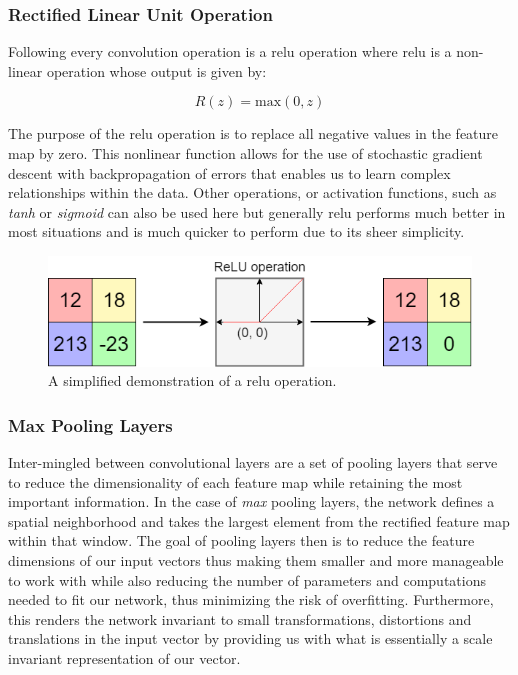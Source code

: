 \subsubsection{Rectified Linear Unit Operation}
\label{subsubsec:Background-Information:Forecasting-Models:Convolutional-Neural-Networks:ReLU}
Following every convolution operation is a \gls{relu} operation where \gls{relu} is a non-linear operation whose output is given by:

\begin{equation}
    R(z) = \text{max}(0, z)
\label{eq:ReLU}
\end{equation}

\noindent \newline The purpose of the \gls{relu} operation is to replace all negative values in the feature map by zero. This nonlinear function allows for the use of stochastic gradient descent with backpropagation of errors that enables us to learn complex relationships within the data.  Other operations, or activation functions, such as \textit{tanh} or \textit{sigmoid} can also be used here but generally \gls{relu} performs much better in most situations and is much quicker to perform due to its sheer simplicity.

\begin{figure}[hbt!]
    \centering
    \includegraphics[width=\textwidth]{Images/Chapter 3/CNN/ReLU-Illustration.png}
    \caption{A simplified demonstration of a \gls{relu} operation.}
    \label{fig:ReLU-Illustration}
\end{figure}

\subsubsection{Max Pooling Layers}
\label{subsubsec:Background-Information:Forecasting-Models:Convolutional-Neural-Networks:Max-Pooling-Layers}
Inter-mingled between convolutional layers are a set of pooling layers that serve to reduce the dimensionality of each feature map while retaining the most important information. In the case of \textit{max} pooling layers, the network defines a spatial neighborhood and takes the largest element from the rectified feature map within that window. The goal of pooling layers then is to reduce the feature dimensions of our input vectors thus making them smaller and more manageable to work with while also reducing the number of parameters and computations needed to fit our network, thus minimizing the risk of overfitting. Furthermore, this renders the network invariant to small transformations, distortions and translations in the input vector by providing us with what is essentially a scale invariant representation of our vector.

